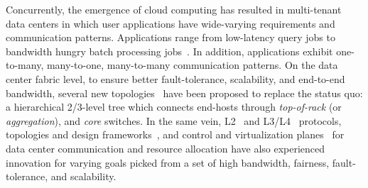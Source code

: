 \documentclass[a4paper,12pt,twoside,openright]{report}
\begin{document}
Concurrently, the emergence of cloud computing has resulted in multi-tenant data
centers in which user applications have wide-varying requirements and
communication patterns. Applications range from low-latency query jobs to
bandwidth hungry batch processing jobs~\cite{Alizadeh:2010:DCT}. In addition,
applications exhibit one-to-many, many-to-one, many-to-many communication
patterns. On the data center fabric level, to ensure better fault-tolerance,
scalability, and end-to-end bandwidth, several new
topologies~\cite{Al-Fares:2008:SCD,Guo:2008:DSF,Guo:2009:BHP,Greenberg:2009:VSF}
have been proposed to replace the status quo: a hierarchical 2/3-level tree
which connects end-hosts through \emph{top-of-rack} (or \emph{aggregation}), and
\emph{core} switches. In the same vein,
L2~\cite{Mudigonda:2010:SCD,Vattikonda:2012:PTD} and
L3/L4~\cite{Alizadeh:2010:DCT,Vasudevan:2009:SEF,Raiciu:2010:DCN,Wilson:2011:BNL,Wu:2010:IIC}
protocols, topologies and design
frameworks~\cite{Singla:2011:JND,Al-Fares:2008:SCD,Guo:2008:DSF,Guo:2009:BHP,Greenberg:2009:VSF,Mudigonda:2011:TFC,Chen:2010:GAA},
and control and virtualization
planes~\cite{NiranjanMysore:2009:PSF,Mudigonda:2011:NSM,Guo:2010:SDC,Ballani:2011:TPD,Shieh:2011:SDC,Rodrigues:2011:GSB,Al-Fares:2010:HDF}
for data center communication and resource allocation have also experienced
innovation for varying goals picked from a set of high bandwidth, fairness,
fault-tolerance, and scalability.
\end{document}
